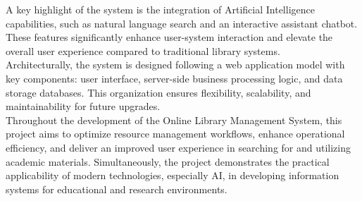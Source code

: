 A key highlight of the system is the integration of Artificial Intelligence capabilities, such as natural language search and an interactive assistant chatbot. These features significantly enhance user-system interaction and elevate the overall user experience compared to traditional library systems.\\

Architecturally, the system is designed following a web application model with key components: user interface, server-side business processing logic, and data storage databases. This organization ensures flexibility, scalability, and maintainability for future upgrades.\\

Throughout the development of the Online Library Management System, this project aims to optimize resource management workflows, enhance operational efficiency, and deliver an improved user experience in searching for and utilizing academic materials. Simultaneously, the project demonstrates the practical applicability of modern technologies, especially AI, in developing information systems for educational and research environments.\\

\clearpage
{}
